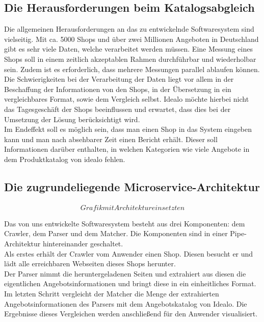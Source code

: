 \subsection{Die Herausforderungen beim Katalogsabgleich}

Die allgemeinen Herausforderungen an das zu entwickelnde Softwaresystem sind vielseitig.
Mit ca. 5000 Shops und über zwei Millionen Angeboten in Deutschland gibt es sehr viele Daten, welche verarbeitet
werden müssen.
Eine Messung eines Shops soll in einem zeitlich akzeptablen Rahmen durchführbar und wiederholbar sein.
Zudem ist es erforderlich, dass mehrere Messungen parallel ablaufen können.\\
Die Schwierigkeiten bei der Verarbeitung der Daten liegt vor allem in der Beschaffung der Informationen von den
Shops, in der Übersetzung in ein vergleichbares Format, sowie dem Vergleich selbst.
Idealo möchte hierbei nicht das Tagesgeschäft der Shops beeinflussen und erwartet, dass dies bei der Umsetzung der
Lösung berücksichtigt wird.\\
Im Endeffekt soll es möglich sein, dass man einen Shop in das System eingeben kann und man nach absehbarer Zeit einen
Bericht erhält.
Dieser soll Informationen darüber enthalten, in welchen Kategorien wie viele Angebote in dem Produktkatalog von
idealo fehlen.

\subsection{Die zugrundeliegende Microservice-Architektur}

\begin{align}
    Grafik mit Architektur einsetzten
\end{align}

Das von uns entwickelte Softwaresystem besteht aus drei Komponenten: dem Crawler, dem Parser und dem Matcher.
Die Komponenten sind in einer Pipe-Architektur hintereinander geschaltet. \\
Als erstes erhält der Crawler vom Anwender einen Shop.
Diesen besucht er und lädt alle erreichbaren Webseiten dieses Shops herunter. \\
Der Parser nimmt die heruntergeladenen Seiten und extrahiert aus diesen die eigentlichen Angebotsinformationen und
bringt diese in ein einheitliches Format. \\
Im letzten Schritt vergleicht der Matcher die Menge der extrahierten Angebotsinformationen des Parsers mit dem
Angebotskatalog von Idealo.
Die Ergebnisse dieses Vergleichen werden anschließend für den Anwender visualisiert.

